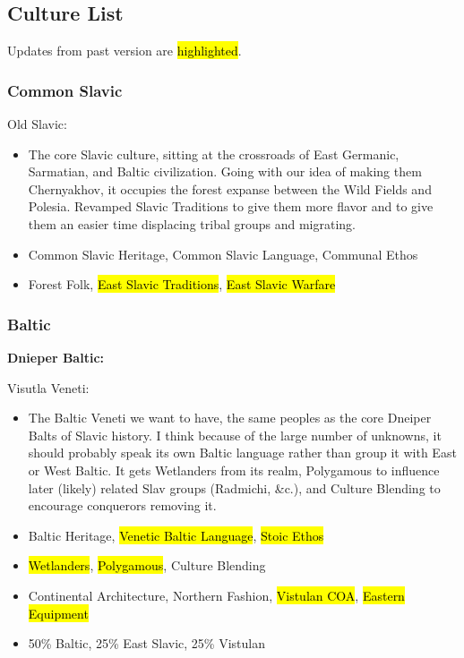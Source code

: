 \documentclass{article}
\begin{document}
	\subsection{Culture List}
	Updates from past version are \hl{highlighted}.
	
	\subsubsection{Common Slavic}
	
	Old Slavic:
	\begin{itemize}
		\item The core Slavic culture, sitting at the crossroads of East Germanic, Sarmatian, and Baltic civilization. Going with our idea of making them Chernyakhov, it occupies the forest expanse between the Wild Fields and Polesia.
		\newline
		Revamped Slavic Traditions to give them more flavor and to give them an easier time displacing tribal groups and migrating.
		\item Common Slavic Heritage, Common Slavic Language, Communal Ethos
		\item Forest Folk, \hl{East Slavic Traditions}, \hl{East Slavic Warfare}
	\end{itemize}
	
	\subsubsection{Baltic}
	
	\textbf{Dnieper Baltic:}
	
	Visutla Veneti:
	\begin{itemize}
		\item The Baltic Veneti we want to have, the same peoples as the core Dneiper Balts of Slavic history. I think because of the large number of unknowns, it should probably speak its own Baltic language rather than group it with East or West Baltic. It gets Wetlanders from its realm, Polygamous to influence later (likely) related Slav groups (Radmichi, \&c.), and Culture Blending to encourage conquerors removing it.
		\item Baltic Heritage, \hl{Venetic Baltic Language}, \hl{Stoic Ethos}
		\item \hl{Wetlanders}, \hl{Polygamous}, Culture Blending
		\item Continental Architecture, Northern Fashion, \hl{Vistulan COA}, \hl{Eastern Equipment}
		\item 50\% Baltic, 25\% East Slavic, 25\% Vistulan
	\end{itemize}
	
\end{document}
